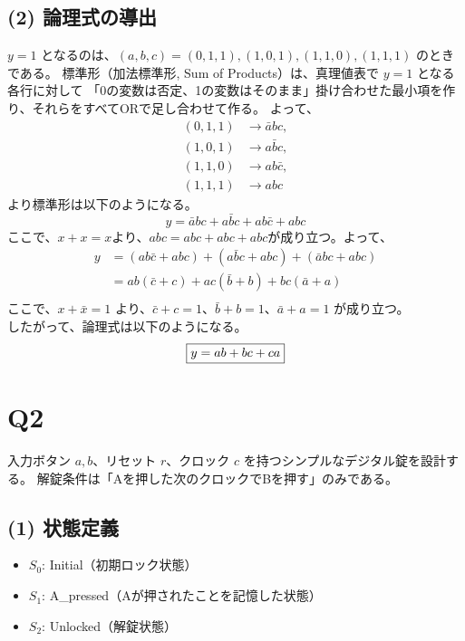 \documentclass[11pt,a4paper]{jlreq}
\begin{document}
\subsection*{(2) 論理式の導出}
$y=1$ となるのは、$(a,b,c)=(0,1,1),(1,0,1),(1,1,0),(1,1,1)$ のときである。
標準形（加法標準形, Sum of Products）は、真理値表で $y=1$ となる各行に対して
「0の変数は否定、1の変数はそのまま」掛け合わせた最小項を作り、それらをすべてORで足し合わせて作る。
よって、
\[
\begin{aligned}
(0,1,1)&\rightarrow \bar{a}bc,\\
(1,0,1)&\rightarrow a\bar{b}c,\\
(1,1,0)&\rightarrow ab\bar{c},\\
(1,1,1)&\rightarrow abc
\end{aligned}
\]
より標準形は以下のようになる。
\[
y=\bar{a}bc+a\bar{b}c+ab\bar{c}+abc
\]
ここで、$x + x = x$より、$abc = abc + abc + abc$が成り立つ。よって、
\[
\begin{aligned}
y
&=(ab\bar{c}+abc)+(a\bar{b}c+abc)+(\bar{a}bc+abc)\\
&=ab(\bar{c}+c)+ac(\bar{b}+b)+bc(\bar{a}+a)\\
\end{aligned}
\]
ここで、$x + \bar{x} = 1$ より、$\bar{c}+c=1$、$\bar{b}+b=1$、$\bar{a}+a=1$ が成り立つ。\\
したがって、論理式は以下のようになる。
\[
\fbox{$y=ab+bc+ca$}
\]

\section*{Q2}
\noindent
入力ボタン $a,b$、リセット $r$、クロック $c$ を持つシンプルなデジタル錠を設計する。
解錠条件は「Aを押した次のクロックでBを押す」のみである。

\subsection*{(1) 状態定義}
\begin{itemize}
\item $S_0$: Initial（初期ロック状態）
\item $S_1$: A\_pressed（Aが押されたことを記憶した状態）
\item $S_2$: Unlocked（解錠状態）
\end{itemize}
\end{document}
